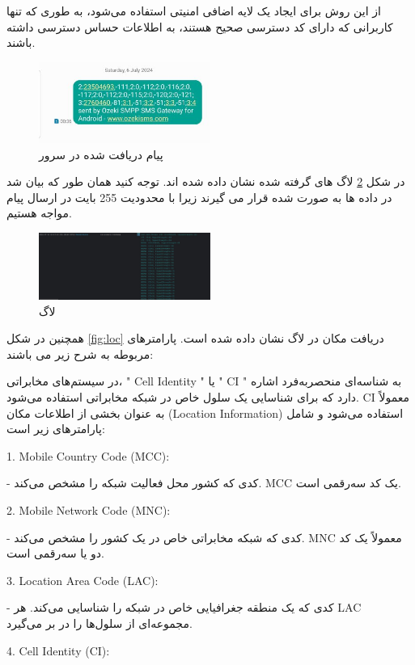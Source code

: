 \documentclass{report}
\begin{document}
از این روش برای ایجاد یک لایه اضافی امنیتی استفاده می‌شود، به طوری که تنها کاربرانی که دارای کد دسترسی صحیح هستند، به اطلاعات حساس دسترسی داشته باشند.

\begin{figure}[b]
	\centering
	\includegraphics[width=0.5\textwidth]{Pic/Message}
	\caption{پیام دریافت شده در سرور}
	\label{fig:Server}
\end{figure}

در شکل \ref{fig:log1} لاگ های گرفته شده نشان داده شده اند. توجه کنید همان طور که بیان شد در 
داده ها به صورت 
شده قرار می گیرند زیرا با محدودیت 255 بایت در ارسال پیام مواجه هستیم.
\begin{figure}[b]
	\centering
	\includegraphics[width=0.5\textwidth]{Pic/log1}
	\caption{لاگ}
	\label{fig:log1}
\end{figure}
همچنین در شکل \ref{fig:loc} دریافت مکان در لاگ نشان داده شده است. پارامترهای مربوطه به شرح زیر می باشند:

در سیستم‌های مخابراتی، "
Cell Identity
" یا "
CI
" به شناسه‌ای منحصربه‌فرد اشاره دارد که برای شناسایی یک سلول خاص در شبکه مخابراتی استفاده می‌شود. CI معمولاً به عنوان بخشی از اطلاعات مکان (Location Information) استفاده می‌شود و شامل پارامترهای زیر است:

1. Mobile Country Code (MCC):

   - کدی که کشور محل فعالیت شبکه را مشخص می‌کند. MCC یک کد سه‌رقمی است.
   
2. Mobile Network Code (MNC):

- کدی که شبکه مخابراتی خاص در یک کشور را مشخص می‌کند. MNC معمولاً یک کد دو یا سه‌رقمی است.

3. Location Area Code (LAC):

   - کدی که یک منطقه جغرافیایی خاص در شبکه را شناسایی می‌کند. هر LAC مجموعه‌ای از سلول‌ها را در بر می‌گیرد.
   
4. Cell Identity (CI):
\end{document}
